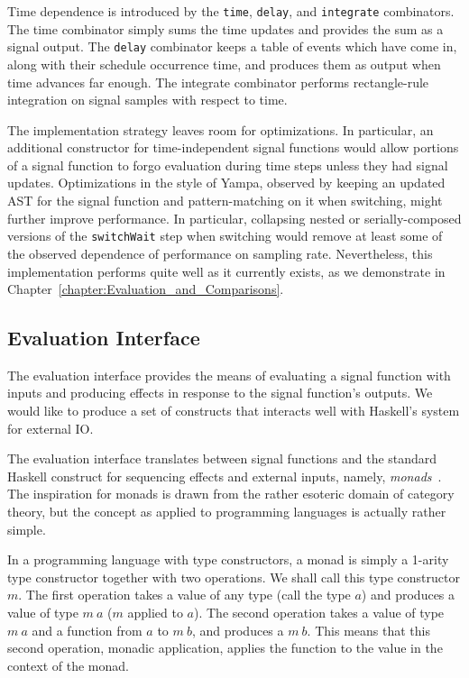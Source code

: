 \documentclass[draft]{llncs}
\begin{document}
Time dependence is introduced by the {\tt time}, {\tt delay}, and {\tt integrate}
combinators. The time combinator simply sums the time updates and provides the
sum as a signal output. The {\tt delay} combinator keeps a table of events
which have come in, along with their schedule occurrence time, and produces
them as output when time advances far enough. The integrate combinator performs
rectangle-rule integration on signal samples with respect to time.

The implementation strategy leaves room for optimizations. In particular, an
additional constructor for time-independent signal functions would allow
portions of a signal function to forgo evaluation during time steps unless they
had signal updates. Optimizations in the style of Yampa, observed by keeping
an updated AST for the signal function and pattern-matching on it when switching,
might further improve performance. In particular, collapsing nested or
serially-composed versions of the {\tt switchWait} step when switching would
remove at least some of the observed dependence of performance on sampling rate.
Nevertheless, this implementation performs quite well as it currently exists, as
we demonstrate in Chapter~\ref{chapter:Evaluation_and_Comparisons}.

\subsection{Evaluation Interface}
\label{subsection:Implementation-Evaluation_Interface}
The evaluation interface provides the means of evaluating a signal function
with inputs and producing effects in response to the signal function's outputs.
We would like to produce a set of constructs that interacts well with Haskell's
system for external IO.

The evaluation interface translates between signal functions and the standard
Haskell construct for sequencing effects and external inputs, namely,
{\em monads}~\cite{PeytonJones1993}. The inspiration for monads is drawn from
the rather esoteric domain of category theory, but the concept as applied to
programming languages is actually rather simple.

In a programming language with type constructors, a monad is simply a 1-arity
type constructor together with two operations. We shall call this type
constructor $m$. The first operation takes a value of any type
(call the type $a$) and produces a value of type $m \: a$ ($m$ applied to $a$).
The second operation takes a value of type $m \: a$ and a function from $a$ to
$m \: b$, and produces a $m \: b$. This means that this second operation,
monadic application, applies the function to the value in the context of the
monad.
\end{document}
